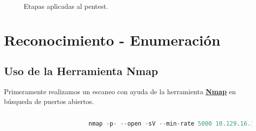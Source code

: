 \documentclass[a4paper]{article} %
\begin{document}
    \begin{figure}[h] %
        \begin{center}
        \end{center}
    \captionsetup{labelfont=bf} %
    \caption{Etapas aplicadas al pentest.}   
    \end{figure}
    
\vspace{5cm}
    
\section{Reconocimiento - Enumeración}

    \subsection{Uso de la Herramienta Nmap}

    \vspace{0.2cm}

    Primeramente realizamos un escaneo con ayuda de la herramienta {\href{https://nmap.org}{\textbf{\color{black}Nmap}}} en búsqueda de puertos abiertos.

    \vspace{0.2cm}

    \captionsetup[lstlisting]{labelfont=bf} %
    \begin{lstlisting}[language=C, caption=Primer escaneo., aboveskip=0.5cm]
         
                        nmap -p- --open -sV --min-rate 5000 10.129.16.121
    \end{lstlisting}
    
\end{document}
